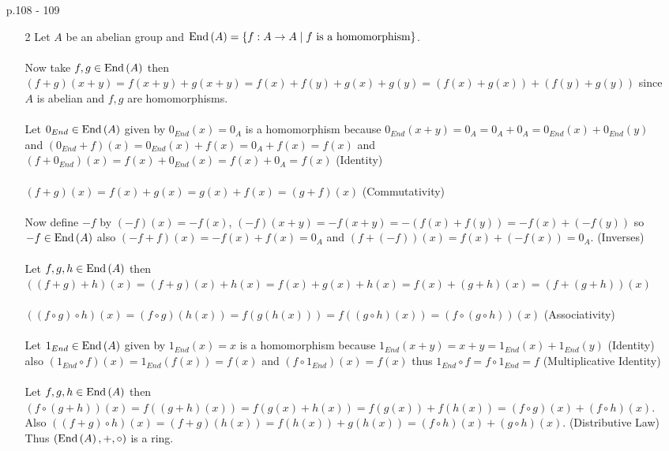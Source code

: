 \documentclass[12pt]{extarticle}
\begin{document}
 
\begin{enumerate}
\item[p.108 - 109]
\begin{enumerate}
\item[2] Let $A$ be an abelian group and $\text{End}\left( A \right) = \{ f : A \rightarrow A \mid f \text{ is a homomorphism} \}$. \\ \\
Now take $f,g \in \text{End}\left( A \right)$ then $(f+g)(x + y) = f(x+y) + g(x+y) = f(x) + f(y) + g(x) + g(y) = (f(x) + g(x)) + (f(y) + g(y))$ since $A$ is abelian and $f,g$ are homomorphisms. \\ \\
Let $0_{End} \in \text{End}\left( A \right)$ given by $0_{End}(x) = 0_A$ is a homomorphism because $0_{End}(x + y) = 0_A = 0_A + 0_A = 0_{End}(x) + 0_{End}(y)$ and $(0_{End} + f)(x) = 0_{End}(x) + f(x) = 0_A + f(x) = f(x)$ and $(f + 0_{End})(x) = f(x) + 0_{End}(x) = f(x) + 0_A = f(x)$ (Identity) \\ \\ 
$(f + g)(x) = f(x) + g(x) = g(x) + f(x) = (g + f)(x)$ (Commutativity) \\ \\
Now define $-f$ by $(-f)(x) = -f(x)$, $(-f)(x + y) = -f(x+y) = -(f(x) + f(y)) = -f(x) + (-f(y))$ so $-f \in \text{End}\left( A \right)$ also $(-f + f)(x) = -f(x) + f(x) = 0_A$ and $(f + (-f))(x) = f(x) + (-f(x)) = 0_A$.  (Inverses) \\ \\
Let $f,g,h \in \text{End}\left( A \right)$ then $((f + g) + h)(x) = (f + g)(x) + h(x) =  f(x) + g(x) + h(x) = f(x) + (g + h)(x) = (f + (g + h))(x)$ \\ \\
$((f \circ g) \circ h)(x) = (f \circ g)(h(x)) = f(g(h(x))) = f((g \circ h)(x)) = (f \circ (g \circ h))(x)$ (Associativity) \\ \\ 
Let $1_{End} \in \text{End}\left( A \right)$ given by $1_{End}(x) = x$ is a homomorphism because $1_{End}(x + y) = x + y = 1_{End}(x) + 1_{End}(y)$ (Identity) also $(1_{End} \circ f)(x) = 1_{End}(f(x)) = f(x)$ and $(f \circ 1_{End})(x) = f(x)$ thus $1_{End} \circ f = f \circ 1_{End} = f$ 
(Multiplicative Identity) \\ \\
Let $f,g,h \in \text{End}\left( A \right)$ then $(f \circ (g + h))(x) = f((g + h)(x)) = f(g(x) + h(x)) = f(g(x)) + f(h(x)) = (f \circ g)(x) + (f \circ h)(x)$. Also $((f + g) \circ h)(x) = (f + g)(h(x)) = f(h(x)) + g(h(x)) = (f \circ h)(x) + (g \circ h)(x)$. (Distributive Law) Thus $(\text{End}\left( A \right), + , \circ )$ is a ring.


\end{enumerate}
\end{enumerate}
\end{document}
